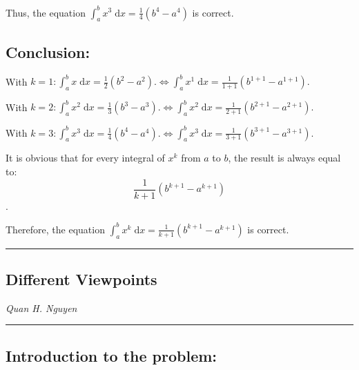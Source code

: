 \documentclass[12pt]{article}
\begin{document}
\noindent Thus, the equation $\displaystyle \int_{a}^b x^3 \; \mathrm{d}x= \frac{1}{4} \left(b^4-a^4 \right)$ is correct.\par

\vspace{1cm}

\subsection*{Conclusion:}

\noindent With $\displaystyle k=1: \int_{a}^b x \; \mathrm{d}x = \frac{1}{2}(b^{2}-a^{2}).
\Longleftrightarrow \int_{a}^b x^1 \; \mathrm{d}x = \frac{1}{1+1}(b^{1+1}-a^{1+1}).$ \par

\noindent With $\displaystyle k=2: \int_{a}^b x^2 \; \mathrm{d}x = \frac{1}{3}(b^{3}-a^{3}).
\Longleftrightarrow \int_{a}^b x^2 \; \mathrm{d}x = \frac{1}{2+1}(b^{2+1}-a^{2+1}).$ \par

\noindent With $\displaystyle k=3: \int_{a}^b x^3 \; \mathrm{d}x = \frac{1}{4}(b^{4}-a^{4}).
\Longleftrightarrow \int_{a}^b x^3 \; \mathrm{d}x = \frac{1}{3+1}(b^{3+1}-a^{3+1}).$ \par

\noindent It is obvious that for every integral of $x^k$ from $a$ to $b$, the result is always equal to: $$\displaystyle \frac{1}{k+1} \left(b^{k+1}-a^{k+1} \right)$$. \par

\noindent Therefore, the equation $\displaystyle \int_{a}^b x^k \; \mathrm{d}x= \frac{1}{k+1} \left(b^{k+1}-a^{k+1} \right)$ is correct.
    



\newpage

\hrule
\vspace{.2mm}
\begin{center}
    \section*{Different Viewpoints}
    \textit{Quan H. Nguyen}
\end{center}
\vspace{.2mm}
\hrule

\subsection*{Introduction to the problem:}
\end{document}
